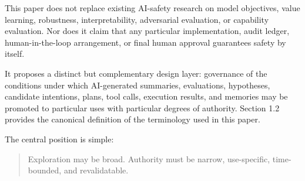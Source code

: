 This paper does not replace existing AI-safety research on model objectives, value learning, robustness, interpretability, adversarial evaluation, or capability evaluation. Nor does it claim that any particular implementation, audit ledger, human-in-the-loop arrangement, or final human approval guarantees safety by itself.

It proposes a distinct but complementary design layer: governance of the conditions under which AI-generated summaries, evaluations, hypotheses, candidate intentions, plans, tool calls, execution results, and memories may be promoted to particular uses with particular degrees of authority. Section 1.2 provides the canonical definition of the terminology used in this paper.

The central position is simple:

\begin{quote}
Exploration may be broad. Authority must be narrow, use-specific, time-bounded, and revalidatable.
\end{quote}

